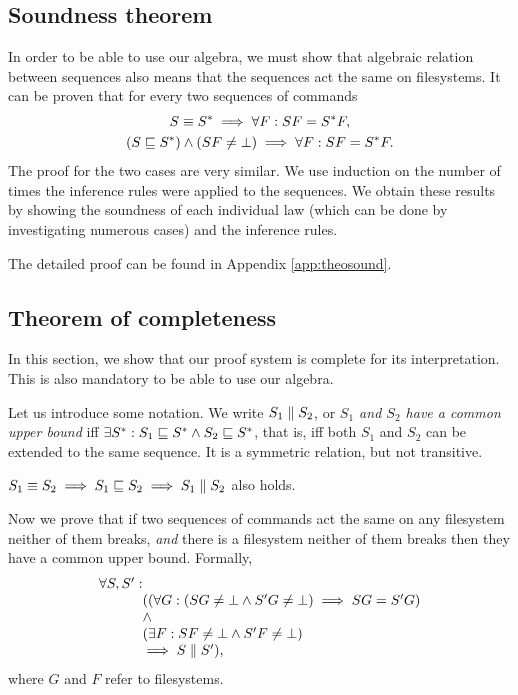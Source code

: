 \begin{table}[H]
\subsection{Soundness theorem}
\label{theorem:soundness}
In order to be able to use our algebra,
we must show that algebraic relation between sequences also means
that the sequences act the same on filesystems.
%
It can be proven that for every two sequences of commands 
\begin{gather*}
S\equiv S^* \implies \forall F: SF=S^*F,\\
(S\eqexp S^*)\wedge(SF\ne\ud)\implies \forall F: SF=S^*F.%
\end{gather*}
The proof for the two cases are very similar. We use induction on the
number of times the inference rules were applied to the sequences. 
We obtain these results by
showing the soundness of each individual law (which can be done by
investigating numerous cases) and the inference rules.

The detailed proof can be found in Appendix \ref{app:theosound}.

\subsection{Theorem of completeness}
\label{theorem:completeness}
In this section, we show that our proof system is complete for its
interpretation. This is also mandatory to be able to use our algebra.

Let us introduce some notation. We write 
\(S_1\parallel S_2\), or \emph{\(S_1\) and \(S_2\) have a common upper 
bound} iff
\(\exists S^*: S_1\sqsubseteq S^* \wedge S_2\sqsubseteq S^*\), that is, iff
both \(S_1\) and \(S_2\) can be extended to the same sequence.
It is a symmetric relation, but not transitive.

\(S_1\equiv S_2\implies S_1\sqsubseteq S_2\implies S_1\parallel S_2\) also
holds.

Now we prove that if 
two sequences of commands act the same on any filesystem neither of
them breaks, \emph{and} there is a filesystem neither of them
breaks then they have a common upper bound.
Formally, 
\[\begin{array}{r@{}l}
\forall S,S':&\\ 
&((\forall G: (SG\ne\ud\wedge S'G\ne\ud)\implies SG=S'G)\\
&\wedge\\
&(\exists F: SF\ne\ud\wedge S'F\ne\ud)\\
&\implies S \eqifnbr S'),
\end{array}\]
where \(G\) and \(F\) refer to filesystems. 


\end{table}
